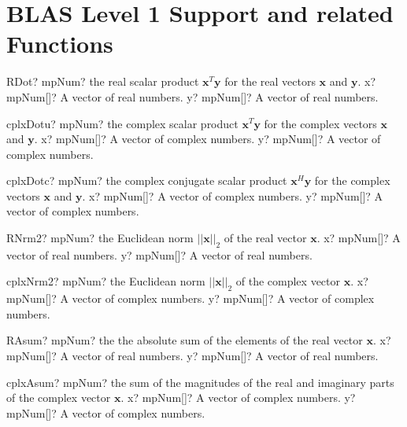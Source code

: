 \documentclass[12pt,a4paper,openany]{book}
\begin{document}
\section{BLAS Level 1 Support and related Functions}

\begin{mpFunctionsExtract}
\mpFunctionTwo
{RDot? mpNum? the real scalar product $\boldsymbol{x}^T \boldsymbol{y}$ for the real vectors $\boldsymbol{x}$ and $\boldsymbol{y}$.}
{x? mpNum[]? A vector of real numbers.}
{y? mpNum[]? A vector of real numbers.}
\end{mpFunctionsExtract}

\begin{mpFunctionsExtract}
\mpFunctionTwo
{cplxDotu? mpNum? the complex  scalar product $\boldsymbol{x}^T \boldsymbol{y}$ for the complex  vectors $\boldsymbol{x}$ and $\boldsymbol{y}$.}
{x? mpNum[]? A vector of complex numbers.}
{y? mpNum[]? A vector of complex numbers.}
\end{mpFunctionsExtract}

\begin{mpFunctionsExtract}
\mpFunctionTwo
{cplxDotc? mpNum? the complex conjugate scalar product $\boldsymbol{x}^H \boldsymbol{y}$ for the complex  vectors $\boldsymbol{x}$ and $\boldsymbol{y}$.}
{x? mpNum[]? A vector of complex numbers.}
{y? mpNum[]? A vector of complex numbers.}
\end{mpFunctionsExtract}

\begin{mpFunctionsExtract}
\mpFunctionTwo
{RNrm2? mpNum? the Euclidean norm $||\boldsymbol{x}||_2$ of the real vector $\boldsymbol{x}$.}
{x? mpNum[]? A vector of real numbers.}
{y? mpNum[]? A vector of real numbers.}
\end{mpFunctionsExtract}

\begin{mpFunctionsExtract}
\mpFunctionTwo
{cplxNrm2? mpNum? the Euclidean norm $||\boldsymbol{x}||_2$ of the complex vector $\boldsymbol{x}$.}
{x? mpNum[]? A vector of complex numbers.}
{y? mpNum[]? A vector of complex numbers.}
\end{mpFunctionsExtract}

\begin{mpFunctionsExtract}
\mpFunctionTwo
{RAsum? mpNum? the the absolute sum of the elements of the real vector $\boldsymbol{x}$.}
{x? mpNum[]? A vector of real numbers.}
{y? mpNum[]? A vector of real numbers.}
\end{mpFunctionsExtract}

\begin{mpFunctionsExtract}
\mpFunctionTwo
{cplxAsum? mpNum? the  sum of the magnitudes of the real and imaginary parts of the complex vector $\boldsymbol{x}$.}
{x? mpNum[]? A vector of complex numbers.}
{y? mpNum[]? A vector of complex numbers.}
\end{mpFunctionsExtract}
\end{document}
